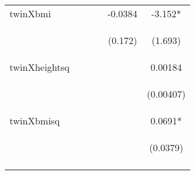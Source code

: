 \begin{table}[htpb!]
\begin{center}
{\begin{tabular}{lccccc}
twinXbmi &  &  &  & -0.0384 & -3.152* \\
\vspace{4pt} & \begin{footnotesize}\end{footnotesize} & \begin{footnotesize}\end{footnotesize} & \begin{footnotesize}\end{footnotesize} & \begin{footnotesize}(0.172)\end{footnotesize} & \begin{footnotesize}(1.693)\end{footnotesize} \\
twinXheightsq &  &  &  &  & 0.00184 \\
\vspace{4pt} & \begin{footnotesize}\end{footnotesize} & \begin{footnotesize}\end{footnotesize} & \begin{footnotesize}\end{footnotesize} & \begin{footnotesize}\end{footnotesize} & \begin{footnotesize}(0.00407)\end{footnotesize} \\
twinXbmisq &  &  &  &  & 0.0691* \\
\vspace{4pt} & \begin{footnotesize}\end{footnotesize} & \begin{footnotesize}\end{footnotesize} & \begin{footnotesize}\end{footnotesize} & \begin{footnotesize}\end{footnotesize} & \begin{footnotesize}(0.0379)\end{footnotesize} \\
\vspace{4pt} & \begin{footnotesize}\end{footnotesize} & \begin{footnotesize}\end{footnotesize} & \begin{footnotesize}\end{footnotesize} & \begin{footnotesize}\end{footnotesize} & \begin{footnotesize}\end{footnotesize} \\

\end{tabular}}
\end{center}
\end{table}
